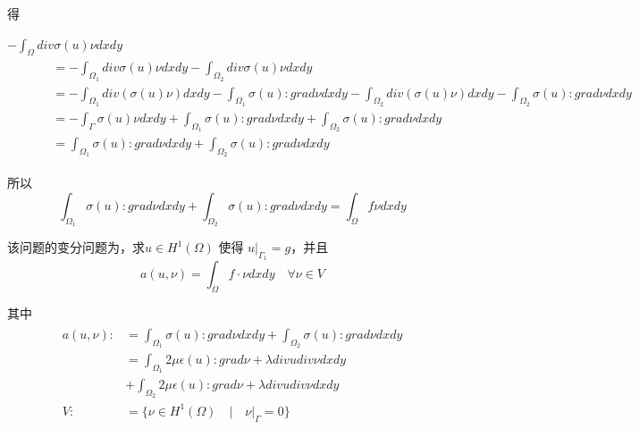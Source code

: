 \documentclass[a4paper,UTF8,titlepage]{ctexart}
\begin{document}
得
\par \quad \quad
$-\int_{\Omega} div \sigma(u) \nu dxdy$
$$ 
\quad \quad
\begin{matrix}
	\begin{aligned}
		&= -\int_{\Omega_1} div \sigma(u) \nu dxdy -\int_{\Omega_2} div \sigma(u) \nu dxdy \\
		&= -\int_{\Omega_1} div(\sigma(u) \nu) dxdy - \int_{\Omega_1} \sigma(u) : grad \nu dxdy  
		-\int_{\Omega_2} div(\sigma(u) \nu) dxdy - \int_{\Omega_2} \sigma(u) : grad \nu dxdy\\
		&= -\int_{\Gamma} \sigma(u) \nu dxdy + \int_{\Omega_1} \sigma(u) : grad \nu dxdy 
		+ \int_{\Omega_2} \sigma(u) : grad \nu dxdy\\
		&= \int_{\Omega_1} \sigma(u) : grad \nu dxdy + \int_{\Omega_2} \sigma(u) : grad \nu dxdy 
	\end{aligned}
\end{matrix}
$$

所以
$$
\int_{\Omega_1} \sigma(u) : grad \nu dxdy + \int_{\Omega_2} \sigma(u) : grad \nu dxdy = \int_{\Omega} f \nu dxdy
$$

该问题的变分问题为，求$u \in H^1(\Omega)$ 使得 $u |_{\Gamma_1} = g$，并且
$$
a(u,\nu) = \int_{\Omega} f \cdot \nu dxdy \quad \forall \nu \in V
$$ 
\par
其中
$$
\begin{matrix}
	\begin{aligned}
		a(u,\nu) :&= \int_{\Omega_1} \sigma(u) : grad \nu dxdy + \int_{\Omega_2} \sigma(u) : grad \nu dxdy \\  
		&= \int_{\Omega_1} 2 \mu \epsilon(u) : grad \nu + \lambda div u div \nu dxdy \\
		&+ \int_{\Omega_2} 2 \mu \epsilon(u) : grad \nu + \lambda div u div \nu dxdy\\
		V :&= \{ \nu \in H^1(\Omega) \quad | \quad \nu |_{\Gamma} = 0 \}
	\end{aligned}
\end{matrix}
$$

\newpage
\vfill



\end{document}
